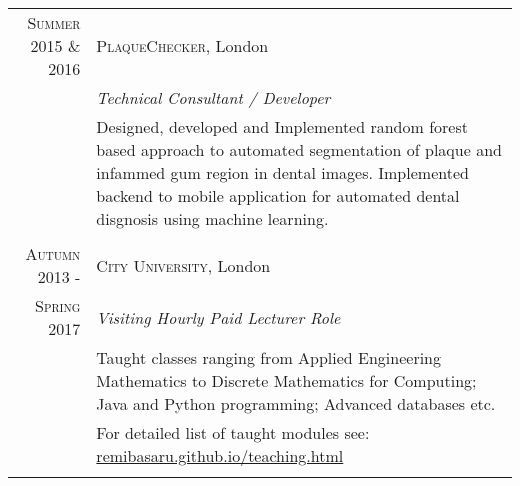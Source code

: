 \documentclass[letterpaper,11pt]{article}
\begin{document}
\begin{tabular}{r|p{14cm}}
\textsc{Summer 2015 \& 2016} & \textsc{PlaqueChecker}, London \\
&\emph{Technical Consultant / Developer}\\
&\footnotesize{Designed, developed and Implemented random forest based approach to automated segmentation of plaque and infammed gum region in dental images. Implemented backend to mobile application for automated dental disgnosis using machine learning.}\\\multicolumn{2}{c}{} \\


\textsc{Autumn 2013 -} & \textsc{City University}, London \\
\textsc{ Spring 2017} &\emph{Visiting Hourly Paid Lecturer Role}\\
&\footnotesize{
Taught classes ranging from Applied Engineering Mathematics  to  Discrete Mathematics for Computing; Java and Python programming; Advanced databases etc.}\\
&\normalsize \textsc{ } \hfill \footnotesize For detailed list of taught modules see: \href{remibasaru.github.io/teaching.html}{remibasaru.github.io/teaching.html}\\
\multicolumn{2}{c}{} \\

\end{tabular}


\end{document}
